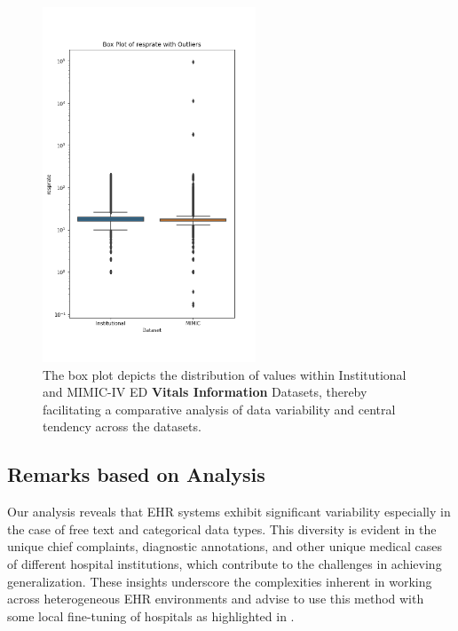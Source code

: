 \documentclass[pmlr]{jmlr}%
\begin{document}
\begin{figure}[h!]
   \includegraphics[width=2.5in]{plots/resprate_boxplot.png} 
   \caption{The box plot depicts the distribution of values within Institutional and MIMIC-IV ED \textbf{Vitals Information} Datasets, thereby facilitating a comparative analysis of data variability and central tendency across the datasets.}
   \label{app6} 
 \end{figure} 

\subsection*{Remarks based on Analysis}

Our analysis reveals that EHR systems exhibit significant variability especially in the case of free text and categorical data types. This diversity is evident in the unique chief complaints, diagnostic annotations, and other unique medical cases of different hospital institutions, which contribute to the challenges in achieving generalization. These insights underscore the complexities inherent in working across heterogeneous EHR environments and advise to use this method with some local fine-tuning of hospitals as highlighted in \citep{jiang2023health}.
\end{document}
